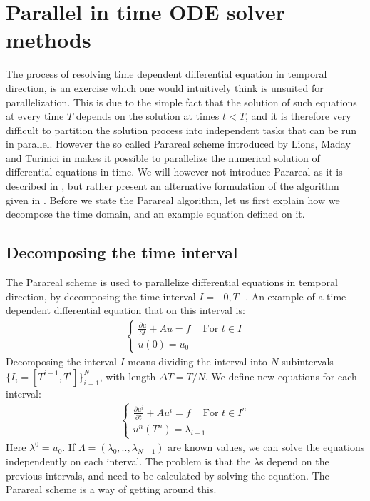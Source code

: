 \chapter{Parallel in time ODE solver methods} \label{parareal_chap}
The process of resolving time dependent differential equation in temporal direction, is an exercise which one would intuitively think is unsuited for parallelization. This is due to the simple fact that the solution of such equations at every time $T$ depends on the solution at times $t<T$, and it is therefore very difficult to partition the solution process into independent tasks that can be run in parallel. However the so called Parareal scheme introduced by Lions, Maday and Turinici in \cite{lions2001resolution} makes it possible to parallelize the numerical solution of differential equations in time. We will however not introduce Parareal as it is described in \cite{lions2001resolution}, but rather present an alternative formulation of the algorithm given in \cite{baffico2002parallel}. Before we state the Parareal algorithm, let us first explain how we decompose the time domain, and an example equation defined on it.
\section{Decomposing the time interval} \label{Para_dcomp_sec}
The Parareal scheme is used to parallelize differential equations in temporal direction, by decomposing the time interval $I=[0,T]$. An example of a time dependent differential equation that on this interval is:
\begin{align}
\left\{
   	\begin{array}{lr}
		\frac{\partial u}{\partial t} + Au = f \ \quad \textrm{For $t \in I$} \\
		u(0)=u_0
	\end{array}
   \right. \label{unbroken}
\end{align} 
Decomposing the interval $I$ means dividing the interval into $N$ subintervals $\{I_i = [T^{i-1},T^{i}]\}_{i=1}^{N}$, with length $\Delta T = T/N$. We define new equations for each interval:
\begin{align}
\left\{
     \begin{array}{lr}
		\frac{\partial u^i}{\partial t} + Au^i = f \ \quad \textrm{For $t \in I^n$} \\
		u^n(T^n)=\lambda_{i-1}
	\end{array}
	\right.	\label{broken}
\end{align}
Here $\lambda^0=u_0$. If $\Lambda=(\lambda_0,..,\lambda_{N-1})$ are known values, we can solve the equations independently on each interval. The problem is that the $\lambda$s depend on the previous intervals, and need to be calculated by solving the equation. The Parareal scheme is a way of getting around this.
